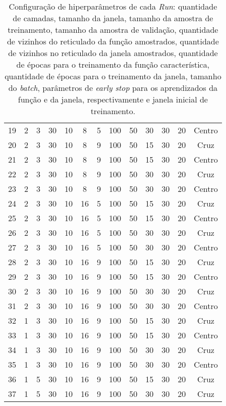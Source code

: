 \begin{table}[ht]
\begin{tabular}{ccccccccccccc}
            19 & 2 & 3 & 30 & 10 & 8 & 5 & 100 & 50 & 30 & 30 & 20 & Centro \\
            20 & 2 & 3 & 30 & 10 & 8 & 9 & 100 & 50 & 15 & 30 & 20 & Cruz \\
            21 & 2 & 3 & 30 & 10 & 8 & 9 & 100 & 50 & 15 & 30 & 20 & Centro \\
            22 & 2 & 3 & 30 & 10 & 8 & 9 & 100 & 50 & 30 & 30 & 20 & Cruz \\
            23 & 2 & 3 & 30 & 10 & 8 & 9 & 100 & 50 & 30 & 30 & 20 & Centro \\
            24 & 2 & 3 & 30 & 10 & 16 & 5 & 100 & 50 & 15 & 30 & 20 & Cruz \\
            25 & 2 & 3 & 30 & 10 & 16 & 5 & 100 & 50 & 15 & 30 & 20 & Centro \\
            26 & 2 & 3 & 30 & 10 & 16 & 5 & 100 & 50 & 30 & 30 & 20 & Cruz \\
            27 & 2 & 3 & 30 & 10 & 16 & 5 & 100 & 50 & 30 & 30 & 20 & Centro \\
            28 & 2 & 3 & 30 & 10 & 16 & 9 & 100 & 50 & 15 & 30 & 20 & Cruz \\
            29 & 2 & 3 & 30 & 10 & 16 & 9 & 100 & 50 & 15 & 30 & 20 & Centro \\
            30 & 2 & 3 & 30 & 10 & 16 & 9 & 100 & 50 & 30 & 30 & 20 & Cruz \\
            31 & 2 & 3 & 30 & 10 & 16 & 9 & 100 & 50 & 30 & 30 & 20 & Centro \\
            32 & 1 & 3 & 30 & 10 & 16 & 9 & 100 & 50 & 15 & 30 & 20 & Cruz \\
            33 & 1 & 3 & 30 & 10 & 16 & 9 & 100 & 50 & 15 & 30 & 20 & Centro \\
            34 & 1 & 3 & 30 & 10 & 16 & 9 & 100 & 50 & 30 & 30 & 20 & Cruz \\
            35 & 1 & 3 & 30 & 10 & 16 & 9 & 100 & 50 & 30 & 30 & 20 & Centro \\
            36 & 1 & 5 & 30 & 10 & 16 & 9 & 100 & 50 & 15 & 30 & 20 & Cruz \\
            37 & 1 & 5 & 30 & 10 & 16 & 9 & 100 & 50 & 30 & 30 & 20 & Cruz \\
            \bottomrule
        \end{tabular}
    \caption[Configuração de hiperparâmetro das \textit{Runs} do experimento de reconhecimento de bordas de dígitos com ruído]{Configuração de hiperparâmetros de cada \textit{Run}: quantidade de camadas, tamanho da janela, tamanho da amostra de treinamento, tamanho da amostra de validação, quantidade de vizinhos do reticulado da função amostrados, quantidade de vizinhos no reticulado da janela amostrados, quantidade de épocas para o treinamento da função característica, quantidade de épocas para o treinamento da janela, tamanho do \textit{batch}, parâmetros de \textit{early stop} para os aprendizados da função e da janela, respectivamente e janela inicial de treinamento.}
    \label{tab:ap_hiperparametros_run}
\end{table}

